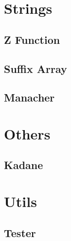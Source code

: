 \section{Strings}
\subsection{Z Function}
\raggedbottom
\vspace{-.7\baselineskip}\hrulefill
\vspace{0.1\baselineskip}\subsection{Suffix Array}
\raggedbottom
\vspace{-.7\baselineskip}\hrulefill
\vspace{0.1\baselineskip}\subsection{Manacher}
\raggedbottom
\vspace{-.7\baselineskip}\hrulefill
\vspace{0.1\baselineskip}
\section{Others}
\subsection{Kadane}
\raggedbottom
\vspace{-.7\baselineskip}\hrulefill
\vspace{0.1\baselineskip}
\section{Utils}
\subsection{Tester}
\raggedbottom
\vspace{-.7\baselineskip}\hrulefill
\vspace{0.1\baselineskip}
